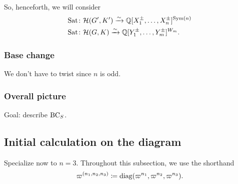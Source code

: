 So, henceforth, we will consider
\begin{align*}
  \operatorname{Sat} &\colon \mathcal H(G', K') \xrightarrow{\sim} \mathbb Q[X_1^\pm, \dots, X_n^\pm]^{\operatorname{Sym}(n)} \\
  \operatorname{Sat} &\colon \mathcal H(G, K) \xrightarrow{\sim} \mathbb Q[Y_1^{\pm}, \dots, Y_m^{\pm}]^{W_m}.
\end{align*}

\subsubsection{Base change}

We don't have to twist since $n$ is odd.

\subsubsection{Overall picture}
\begin{center}
\end{center}
Goal: describe $\operatorname{BC}_S$.


\subsection{Initial calculation on the diagram}
Specialize now to $n=3$.
Throughout this subsection, we use the shorthand
\[ \varpi^{(n_1, n_2, n_3)} \coloneqq \operatorname{diag}(\varpi^{n_1}, \varpi^{n_2}, \varpi^{n_3}). \]

